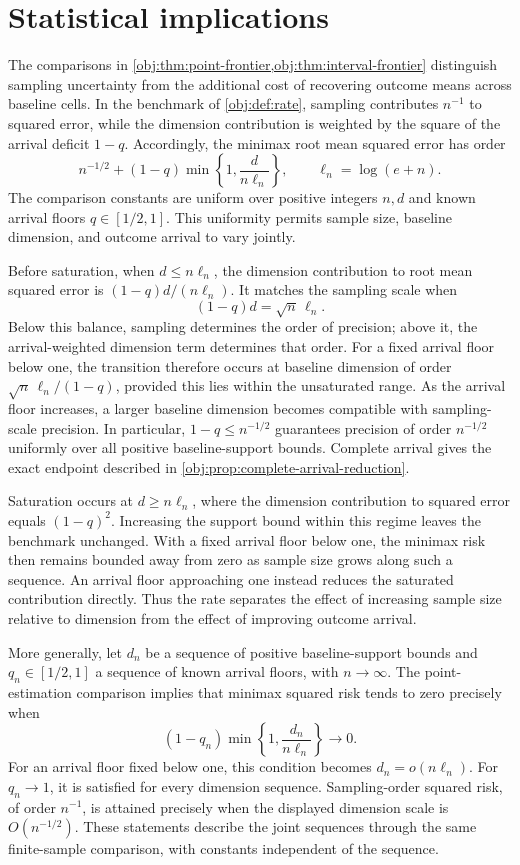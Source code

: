 \documentclass[11pt]{article}
\begin{document}
\section{Statistical implications}

The comparisons in \cref{obj:thm:point-frontier,obj:thm:interval-frontier} distinguish sampling uncertainty from the additional cost of recovering outcome means across baseline cells. In the benchmark of \cref{obj:def:rate}, sampling contributes \(n^{-1}\) to squared error, while the dimension contribution is weighted by the square of the arrival deficit \(1-q\). Accordingly, the minimax root mean squared error has order
\[
n^{-1/2}+(1-q)\min\left\{1,\frac{d}{n\ell_n}\right\},
\qquad \ell_n=\log(e+n).
\]
The comparison constants are uniform over positive integers \(n,d\) and known arrival floors \(q\in[1/2,1]\). This uniformity permits sample size, baseline dimension, and outcome arrival to vary jointly.

Before saturation, when \(d\le n\ell_n\), the dimension contribution to root mean squared error is \((1-q)d/(n\ell_n)\). It matches the sampling scale when
\[
(1-q)d=\sqrt n\,\ell_n.
\]
Below this balance, sampling determines the order of precision; above it, the arrival-weighted dimension term determines that order. For a fixed arrival floor below one, the transition therefore occurs at baseline dimension of order \(\sqrt n\,\ell_n/(1-q)\), provided this lies within the unsaturated range. As the arrival floor increases, a larger baseline dimension becomes compatible with sampling-scale precision. In particular, \(1-q\le n^{-1/2}\) guarantees precision of order \(n^{-1/2}\) uniformly over all positive baseline-support bounds. Complete arrival gives the exact endpoint described in \cref{obj:prop:complete-arrival-reduction}.

Saturation occurs at \(d\ge n\ell_n\), where the dimension contribution to squared error equals \((1-q)^2\). Increasing the support bound within this regime leaves the benchmark unchanged. With a fixed arrival floor below one, the minimax risk then remains bounded away from zero as sample size grows along such a sequence. An arrival floor approaching one instead reduces the saturated contribution directly. Thus the rate separates the effect of increasing sample size relative to dimension from the effect of improving outcome arrival.

More generally, let \(d_n\) be a sequence of positive baseline-support bounds and \(q_n\in[1/2,1]\) a sequence of known arrival floors, with \(n\to\infty\). The point-estimation comparison implies that minimax squared risk tends to zero precisely when
\[
(1-q_n)\min\left\{1,\frac{d_n}{n\ell_n}\right\}\longrightarrow0.
\]
For an arrival floor fixed below one, this condition becomes \(d_n=o(n\ell_n)\). For \(q_n\to1\), it is satisfied for every dimension sequence. Sampling-order squared risk, of order \(n^{-1}\), is attained precisely when the displayed dimension scale is \(O(n^{-1/2})\). These statements describe the joint sequences through the same finite-sample comparison, with constants independent of the sequence.
\end{document}
